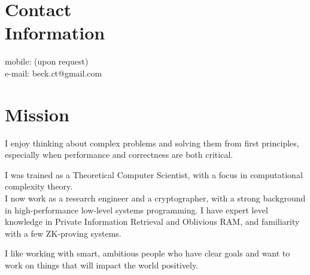 \documentclass[margin,line]{resume}
\begin{document}
\begin{resume}

    \section{\mysidestyle Contact\\Information}

                                                          \hfill mobile: (upon request)          \vspace{0mm}\\\vspace{0mm}%
                                                          \hfill e-mail: beck.ct@gmail.com  \vspace{0mm}\\\vspace{-4.5mm}%

    \section{\mysidestyle Mission}

    I enjoy thinking about complex problems and solving them from first principles, especially when performance and correctness are both critical.

    I was trained as a Theoretical Computer Scientist, with a focus in computational complexity theory.\\
    I now work as a research engineer and a cryptographer, with a strong background in high-performance low-level systems programming.
    I have expert level knowledge in Private Information Retrieval and Oblivious RAM, and familiarity with a few ZK-proving systems.

    I like working with smart, ambitious people who have clear goals and want to work on things that will impact the world positively.


\end{resume}
\end{document}
